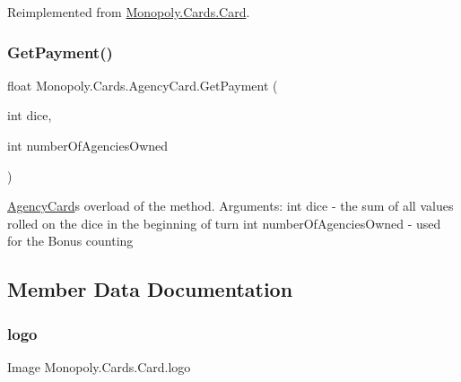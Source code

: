 Reimplemented from \mbox{\hyperlink{class_monopoly_1_1_cards_1_1_card_a3a30376e286fdae69bf7c77cd6620fe3}{Monopoly.\+Cards.\+Card}}.

\mbox{\label{class_monopoly_1_1_cards_1_1_agency_card_a53d78c8afb2c5043dbb016d46e8102ce}} 
\subsubsection{\texorpdfstring{Get\+Payment()}{GetPayment()}\hspace{0.1cm}{\footnotesize\ttfamily [2/2]}}
{\footnotesize\ttfamily float Monopoly.\+Cards.\+Agency\+Card.\+Get\+Payment (\begin{DoxyParamCaption}\item[{int}]{dice,  }\item[{int}]{number\+Of\+Agencies\+Owned }\end{DoxyParamCaption})\hspace{0.3cm}{\ttfamily [inline]}}

\mbox{\hyperlink{class_monopoly_1_1_cards_1_1_agency_card}{Agency\+Card}}\textquotesingle{}s overload of the method. Arguments\+: int dice -\/ the sum of all values rolled on the dice in the beginning of turn int number\+Of\+Agencies\+Owned -\/ used for the Bonus counting 

\subsection{Member Data Documentation}
\mbox{\label{class_monopoly_1_1_cards_1_1_card_a84da6fc446a55518f9bdf8fa7eef9057}} 
\subsubsection{\texorpdfstring{logo}{logo}}
{\footnotesize\ttfamily Image Monopoly.\+Cards.\+Card.\+logo\hspace{0.3cm}{\ttfamily [inherited]}}



